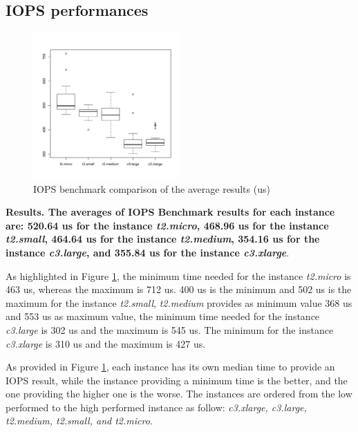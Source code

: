 \documentclass[10pt, conference]{IEEEtran}
\begin{document}
\

\noindent{}

\

\

\subsection{IOPS performances}


\begin{figure}
	\includegraphics[width=0.5\textwidth]{plots/iopingAvr.pdf}
	\caption{\label{fig:IOPSResults} IOPS benchmark comparison of the average results (us)}
\end{figure}


\textbf{Results. The averages of IOPS Benchmark results for each instance are: 520.64 us for the instance \textit{t2.micro}, 468.96 us for the instance \textit{t2.small}, 464.64 us for the instance \textit{t2.medium}, 354.16 us for the instance \textit{c3.large}, and 355.84 us for the instance \textit{c3.xlarge}}.

As highlighted in Figure \ref{fig:IOPSResults}, the minimum time needed for the instance \textit{t2.micro} is 463 us, whereas the maximum is 712 us. 400 us is the minimum and 502 us is the maximum for the instance \textit{t2.small}, \textit{t2.medium} provides as minimum value 368 us and 553 us as maximum value, the minimum time needed for the instance \textit{c3.large} is 302 us and the maximum is 545 us. The minimum for the instance \textit{c3.xlarge} is 310 us and the maximum is 427 us. 

As provided in Figure \ref{fig:IOPSResults}, each instance has its own median time to provide an IOPS result, while the instance providing a minimum time is the better, and the one providing the higher one is the worse. The instances are ordered from the low performed to the high performed instance as follow: \textit{c3.xlarge, c3.large, t2.medium, t2.small, and t2.micro}.
\end{document}
